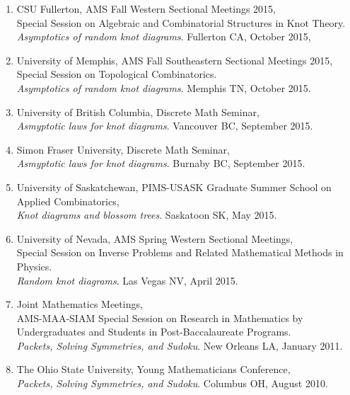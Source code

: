 \documentclass[letterpaper]{article}
\begin{document}
\begin{enumerate}
\item CSU Fullerton, AMS Fall Western Sectional Meetings 2015,\\
  Special Session on Algebraic and Combinatorial Structures in Knot Theory. \\
  \textit{Asymptotics of random knot diagrams}. Fullerton CA, October 2015,

\item University of Memphis, AMS Fall Southeastern Sectional Meetings 2015,\\
  Special Session on Topological Combinatorics. \\
  \textit{Asymptotics of random knot diagrams}. Memphis TN, October 2015.

\item University of British Columbia, Discrete Math Seminar, \\
  \textit{Asmyptotic laws for knot diagrams}. Vancouver BC, September 2015.
  
\item Simon Fraser University, Discrete Math Seminar, \\
  \textit{Asmyptotic laws for knot diagrams}. Burnaby BC, September 2015.

\item University of Saskatchewan, PIMS-USASK Graduate Summer School on Applied Combinatorics, \\
  \textit{Knot diagrams and blossom trees}. Saskatoon SK, May 2015.
  
\item University of Nevada, AMS Spring Western Sectional Meetings,\\
  Special Session on Inverse Problems and Related Mathematical Methods in Physics. \\
  \textit{Random knot diagrams}. Las Vegas NV, April 2015.
  
\item Joint Mathematics Meetings, \\
  AMS-MAA-SIAM Special Session on Research in Mathematics by
  Undergraduates and Students in Post-Baccalaureate Programs.\\
  \textit{Packets, Solving Symmetries, and Sudoku}. New Orleans LA, January 2011.
  
\item The Ohio State University, Young Mathematicians Conference, \\
  \textit{Packets, Solving Symmetries, and Sudoku}. Columbus OH, August 2010.
\end{enumerate}
\end{document}
